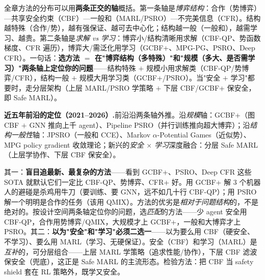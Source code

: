 \begin{insight}[一张表里藏着两条正交的轴]
全章方法的分布可以用\textbf{两条正交的轴}概括。第一条轴是\emph{博弈结构}：合作（势博弈）—共享安全约束（CBF）—一般和（MARL/PSRO）—不完美信息（CFR）。结构越特殊（合作/势），越有强保证、越可去中心化；结构越一般（一般和），越需学习、越贵。第二条轴是\emph{求解 vs 学习}：博弈小/结构清晰用求解（CBF-QP、势函数梯度、CFR 遍历），博弈大/需泛化用学习（GCBF+、MPG-PG、PSRO、Deep CFR）。一句话：\textbf{选方法 $=$ 在"博弈结构（多特殊）"和"规模（多大、是否需学习）"两条轴上定位你的问题}——结构特殊 $+$ 规模小用求解类（CBF-QP/势博弈/CFR），结构一般 $+$ 规模大用学习类（GCBF+/PSRO）。当"安全 $+$ 学习"都要时，走分层架构（上层 MARL/PSRO 学策略 $+$ 下层 CBF/GCBF+ 保安全，即 Safe MARL）。
\end{insight}

\begin{note}
\textbf{近五年前沿的定位（2021--2026）.}\;前沿沿两条轴外推。沿\emph{规模}轴：GCBF+\cite{zhang2025gcbfplus}（图 CBF $+$ GNN 推向上千 agent）、Pipeline PSRO\cite{mcaleer2020pipeline}（并行训练推向超大博弈）；沿\emph{结构一般性}轴：JPSRO\cite{marris2021jpsro}（一般和 CCE）、Markov $\alpha$-Potential Games（近似势）、MPG policy gradient 收敛理论\cite{leonardos2022mpg,ding2022mpg}；新兴的\emph{安全 $\times$ 学习}深度融合：分层 Safe MARL（上层学协作、下层 CBF 保安全）。
\end{note}

\begin{pitfall}
其一：\textbf{盲目追最新、最复杂的方法}——看到 GCBF+、PSRO、Deep CFR 这些 SOTA 就默认它们一定比 CBF-QP、势博弈、CFR+ 好。用 GCBF+ 解 3 个机器人的避碰是杀鸡用牛刀（要训练、要 GNN，远不如几十行 CBF-QP）；用 PSRO 解一个明明是合作的任务（该用 QMIX）。方法的优劣是\emph{相对于问题结构}的，不是绝对的。按设计空间两条轴定位你的问题，选\emph{匹配}的方法——少 agent 安全用 CBF-QP，合作用势博弈/QMIX，大规模才上 GCBF+，一般和大博弈才上 PSRO。其二：\textbf{以为"安全"和"学习"必须二选一}——以为要么用 CBF（硬安全、不学习）、要么用 MARL（学习、无硬保证）。安全（CBF）和学习（MARL）是\emph{互补}的，可分层组合——上层 MARL 学策略（追求性能/协作），下层 CBF 滤波保安全（兜底），这正是 Safe MARL 的主流形态。检验方法：把 CBF 当 safety shield 套在 RL 策略外，既学又安全。
\end{pitfall}

